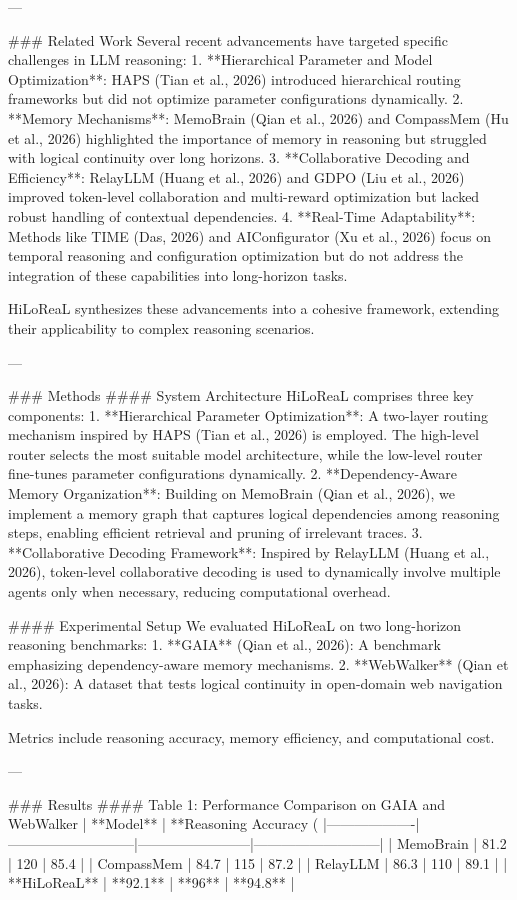 ---

### Related Work
Several recent advancements have targeted specific challenges in LLM reasoning:
1. **Hierarchical Parameter and Model Optimization**: HAPS (Tian et al., 2026) introduced hierarchical routing frameworks but did not optimize parameter configurations dynamically.
2. **Memory Mechanisms**: MemoBrain (Qian et al., 2026) and CompassMem (Hu et al., 2026) highlighted the importance of memory in reasoning but struggled with logical continuity over long horizons.
3. **Collaborative Decoding and Efficiency**: RelayLLM (Huang et al., 2026) and GDPO (Liu et al., 2026) improved token-level collaboration and multi-reward optimization but lacked robust handling of contextual dependencies.
4. **Real-Time Adaptability**: Methods like TIME (Das, 2026) and AIConfigurator (Xu et al., 2026) focus on temporal reasoning and configuration optimization but do not address the integration of these capabilities into long-horizon tasks.

HiLoReaL synthesizes these advancements into a cohesive framework, extending their applicability to complex reasoning scenarios.

---

### Methods
#### System Architecture
HiLoReaL comprises three key components:
1. **Hierarchical Parameter Optimization**: A two-layer routing mechanism inspired by HAPS (Tian et al., 2026) is employed. The high-level router selects the most suitable model architecture, while the low-level router fine-tunes parameter configurations dynamically.
2. **Dependency-Aware Memory Organization**: Building on MemoBrain (Qian et al., 2026), we implement a memory graph that captures logical dependencies among reasoning steps, enabling efficient retrieval and pruning of irrelevant traces.
3. **Collaborative Decoding Framework**: Inspired by RelayLLM (Huang et al., 2026), token-level collaborative decoding is used to dynamically involve multiple agents only when necessary, reducing computational overhead.

#### Experimental Setup
We evaluated HiLoReaL on two long-horizon reasoning benchmarks:
1. **GAIA** (Qian et al., 2026): A benchmark emphasizing dependency-aware memory mechanisms.
2. **WebWalker** (Qian et al., 2026): A dataset that tests logical continuity in open-domain web navigation tasks.

Metrics include reasoning accuracy, memory efficiency, and computational cost.

---

### Results
#### Table 1: Performance Comparison on GAIA and WebWalker
| **Model**        | **Reasoning Accuracy (%
|-------------------|---------------------------|------------------------|---------------------------|
| MemoBrain         | 81.2                      | 120                    | 85.4                      |
| CompassMem        | 84.7                      | 115                    | 87.2                      |
| RelayLLM          | 86.3                      | 110                    | 89.1                      |
| **HiLoReaL**      | **92.1**                  | **96**                 | **94.8**                  |

